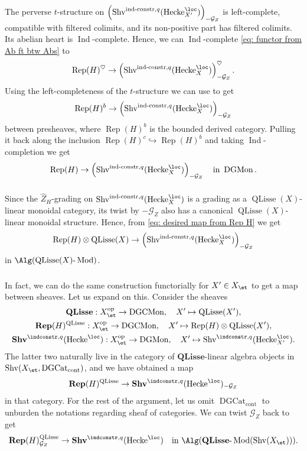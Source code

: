 \documentclass[10pt]{amsart}
\newcommand{\sssec}{\subsubsection}
\theoremstyle{remark}
\newcommand{\te}{\text}
\newcommand{\wh}{\widehat}
\newcommand{\on}{\operatorname}
\newcommand{\cG}{\mathcal{G}}
\newcommand{\DGcat}{\on{DGCat}_{\on{cont}}}
\newcommand{\DGCatMon}{\on{DGMon}}
\newcommand{\DGCatSymMon}{\on{DGCMon}}
\newcommand{\lMod}{\text{-}\on{Mod}}
\newcommand{\Rep}{\on{Rep}}
\newcommand{\Shv}{\on{Shv}}
\newcommand{\QLisse}{\on{QLisse}}
\DeclareMathOperator{\Ind}{Ind}
\DeclareMathOperator{\op}{op}
\newcommand{\Hecke}{\on{Hecke}}
\begin{document}
    The perverse $t$-structure on $\left(\Shv^{\on{ind-constr},q}(\Hecke^{\loc}_{X'})\right)_{-\cG_Z}$ is left-complete, compatible with filtered colimits, and its non-positive part has filtered colimits. Its abelian heart is $\Ind$-complete. Hence, we can $\Ind$-complete \eqref{eq: functor from Ab ft btw Abs} to
\[\Rep(H)^{\heartsuit}\rightarrow \left(\Shv^{\on{ind-constr},q}(\Hecke^{\loc}_{X})\right)_{-\cG_Z}^{\heartsuit}.\]
Using the left-completeness of the $t$-structure we can use \cite[Theorem 1.3.3.2]{HA} to get
\[\Rep(H)^b\rightarrow \left(\Shv^{\on{ind-constr},q}(\Hecke^{\loc}_{X})\right)_{-\cG_Z}\]
between presheaves, where $\Rep(H)^b$ is the bounded derived category. Pulling it back along the inclusion $\Rep(H)^c\hookrightarrow \Rep(H)^b$ and taking $\Ind$-completion we get
\begin{equation}\label{eq: desired map from Rep H}
    \Rep(H)\rightarrow \left(\Shv^{\on{ind-constr},q}(\Hecke^{\loc}_{X})\right)_{-\cG_Z}\quad\te{in }\DGCatMon.
\end{equation}

\sssec{}
Since the $\wh{Z}_H$-grading on $\Shv^{\on{ind-constr},q}(\Hecke^{\loc}_{X})$ is a grading as a $\QLisse(X)$-linear monoidal category, its twist by $-\cG_Z$ also has a canonical $\QLisse(X)$-linear monoidal structure. Hence, from \eqref{eq: desired map from Rep H} we get 
\begin{equation*}
    \Rep(H)\otimes \QLisse(X)\rightarrow \left(\Shv^{\on{ind-constr},q}(\Hecke^{\loc}_{X})\right)_{-\cG_Z}
\end{equation*}
in $\Alg(\QLisse(X)\lMod)$.

\sssec{}\label{sssec: list of sheaves}
In fact, we can do the same construction functorially for $X'\in X_{\et}$ to get a map between sheaves. Let us expand on this. Consider the sheaves
\begin{gather*}
    \mathbf{QLisse}: X^{\op}_{\et}\rightarrow \DGCatSymMon,\quad X'\mapsto \QLisse(X'), \\ \mathbf{Rep}(H)^{\QLisse}: X^{\op}_{\et}\rightarrow \DGCatSymMon,\quad X'\mapsto \Rep(H)\otimes\QLisse(X'), \\
\mathbf{Shv}^{\indconstr,q}(\Hecke^{\loc}):X^{\op}_{\et}\rightarrow \DGCatMon,\quad X'\mapsto \Shv^{\indconstr,q}(\Hecke^{\loc}_{X'}).
\end{gather*}
The latter two naturally live in the category of $\mathbf{QLisse}$-linear algebra objects in $\Shv(X_{\et}, \DGcat)$, and we have obtained a map
\[\mathbf{Rep}(H)^{\QLisse}\rightarrow \mathbf{Shv}^{\indconstr,q}(\Hecke^{\loc})_{-\cG_Z}\]
in that category. For the rest of the argument, let us omit $\DGcat$ to unburden the notations regarding sheaf of categories. We can twist $\cG_Z$ back to get
\begin{equation}\label{eq: functor 1}
    \mathbf{Rep}(H)^{\QLisse}_{\cG_Z}\rightarrow \mathbf{Shv}^{\indconstr,q}(\Hecke^{\loc})\quad\te{in }\Alg(\mathbf{QLisse}\lMod(\Shv(X_{\et}))).
\end{equation}
\end{document}
